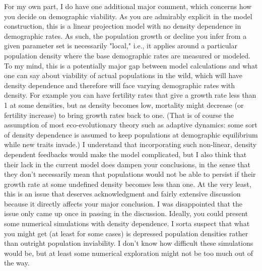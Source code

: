 \documentclass[11pt]{article}
\begin{document}
For my own part, I do have one additional major comment, which concerns how you decide on demographic viability. As you are admirably explicit in the model construction, this is a linear projection model with no density dependence in demographic rates. As such, the population growth or decline you infer from a given parameter set is necessarily "local," i.e., it applies around a particular population density where the base demographic rates are measured or modeled. To my mind, this is a potentially major gap between model calculations and what one can say about viability of actual populations in the wild, which will have density dependence and therefore will face varying demographic rates with density. For example you can have fertility rates that give a growth rate less than 1 at some densities, but as density becomes low, mortality might decrease (or fertility increase) to bring growth rates back to one. (That is of course the assumption of most eco-evolutionary theory such as adaptive dynamics: some sort of density dependence is assumed to keep populations at demographic equilibrium while new traits invade.) I understand that incorporating such non-linear, density dependent feedbacks would make the model complicated, but I also think that their lack in the current model does dampen your conclusions, in the sense that they don’t necessarily mean that populations would not be able to persist if their growth rate at some undefined density becomes less than one. At the very least, this is an issue that deserves acknowledgment and fairly extensive discussion because it directly affects your major conclusion. I was disappointed that the issue only came up once in passing in the discussion. Ideally, you could present some numerical simulations with density dependence. I sorta suspect that what you might get (at least for some cases) is depressed population densities rather than outright population inviability. I don’t know how difficult these simulations would be, but at least some numerical exploration might not be too much out of the way.
\end{document}
